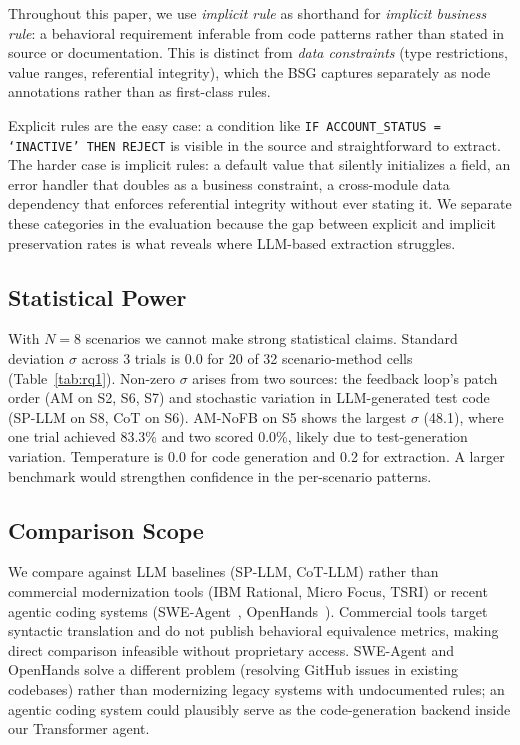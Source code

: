 \documentclass[conference]{IEEEtran}
\begin{document}
Throughout this paper, we use \textit{implicit rule} as shorthand for \textit{implicit business rule}: a behavioral requirement inferable from code patterns rather than stated in source or documentation. This is distinct from \textit{data constraints} (type restrictions, value ranges, referential integrity), which the BSG captures separately as node annotations rather than as first-class rules.

Explicit rules are the easy case: a condition like \texttt{IF ACCOUNT\_STATUS = `INACTIVE' THEN REJECT} is visible in the source and straightforward to extract. The harder case is implicit rules: a default value that silently initializes a field, an error handler that doubles as a business constraint, a cross-module data dependency that enforces referential integrity without ever stating it. We separate these categories in the evaluation because the gap between explicit and implicit preservation rates is what reveals where LLM-based extraction struggles.

\subsection{Statistical Power}

With $N=8$ scenarios we cannot make strong statistical claims. Standard deviation $\sigma$ across 3 trials is 0.0 for 20 of 32 scenario-method cells (Table~\ref{tab:rq1}). Non-zero $\sigma$ arises from two sources: the feedback loop's patch order (AM on S2, S6, S7) and stochastic variation in LLM-generated test code (SP-LLM on S8, CoT on S6). AM-NoFB on S5 shows the largest $\sigma$ (48.1), where one trial achieved 83.3\% and two scored 0.0\%, likely due to test-generation variation. Temperature is 0.0 for code generation and 0.2 for extraction. A larger benchmark would strengthen confidence in the per-scenario patterns.

\subsection{Comparison Scope}

We compare against LLM baselines (SP-LLM, CoT-LLM) rather than commercial modernization tools (IBM Rational, Micro Focus, TSRI) or recent agentic coding systems (SWE-Agent~\cite{yang2024sweagent}, OpenHands~\cite{wang2024openhands}). Commercial tools target syntactic translation and do not publish behavioral equivalence metrics, making direct comparison infeasible without proprietary access. SWE-Agent and OpenHands solve a different problem (resolving GitHub issues in existing codebases) rather than modernizing legacy systems with undocumented rules; an agentic coding system could plausibly serve as the code-generation backend inside our Transformer agent.
\end{document}
